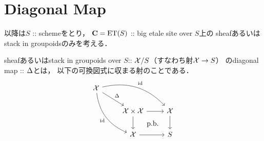 \section{Diagonal Map}
\begin{Remark}
    以降は$S$ :: schemeをとり，
    $\mathbf{C}=\mathrm{ET}(S)$ :: big etale site over $S$上の
    sheafあるいはstack in groupoidsのみを考える．
\end{Remark}

\begin{Def}
    sheafあるいはstack in groupoids over $S$:: $\mathcal{X}/S$（すなわち射$\mathcal{X} \to S$）
    のdiagonal map :: $\Delta$とは，
    以下の可換図式に収まる射のことである．
    \[\begin{tikzcd}
            \stX \ar[rrd, bend left, "\id"]\ar[rdd, bend right, "\id"']\ar[rd, "\Diag"]&
                                                            & \\
                                                            &
        \stX \times \stX \ar[r]\ar[d]\ar[rd, phantom, "\text{p.b.}"]& \stX \ar[d]\\
          &\stX \ar[r]& S
    \end{tikzcd}\]
\end{Def}

